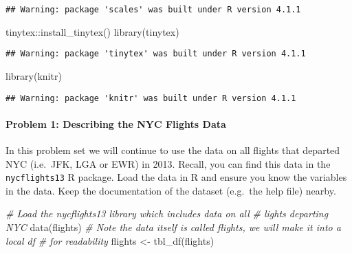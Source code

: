 \documentclass[
]{article}
\newenvironment{Shaded}{\begin{snugshade}}{\end{snugshade}}
\newcommand{\CommentTok}[1]{\textcolor[rgb]{0.56,0.35,0.01}{\textit{#1}}}
\newcommand{\FunctionTok}[1]{\textcolor[rgb]{0.00,0.00,0.00}{#1}}
\newcommand{\NormalTok}[1]{#1}
\newcommand{\OtherTok}[1]{\textcolor[rgb]{0.56,0.35,0.01}{#1}}
\newcommand{\SpecialCharTok}[1]{\textcolor[rgb]{0.00,0.00,0.00}{#1}}
\begin{document}
\begin{verbatim}
## Warning: package 'scales' was built under R version 4.1.1
\end{verbatim}

\begin{Shaded}
\begin{Highlighting}[]
\NormalTok{tinytex}\SpecialCharTok{::}\FunctionTok{install\_tinytex}\NormalTok{()}
\FunctionTok{library}\NormalTok{(tinytex)}
\end{Highlighting}
\end{Shaded}

\begin{verbatim}
## Warning: package 'tinytex' was built under R version 4.1.1
\end{verbatim}

\begin{Shaded}
\begin{Highlighting}[]
\FunctionTok{library}\NormalTok{(knitr)}
\end{Highlighting}
\end{Shaded}

\begin{verbatim}
## Warning: package 'knitr' was built under R version 4.1.1
\end{verbatim}

\hypertarget{problem-1-describing-the-nyc-flights-data}{%
\paragraph{Problem 1: Describing the NYC Flights
Data}\label{problem-1-describing-the-nyc-flights-data}}

In this problem set we will continue to use the data on all flights that
departed NYC (i.e.~JFK, LGA or EWR) in 2013. Recall, you can find this
data in the \texttt{nycflights13} R package. Load the data in R and
ensure you know the variables in the data. Keep the documentation of the
dataset (e.g.~the help file) nearby.

\begin{Shaded}
\begin{Highlighting}[]
\CommentTok{\# Load the nycflights13 library which includes data on all}
\CommentTok{\# lights departing NYC}
\FunctionTok{data}\NormalTok{(flights)}
\CommentTok{\# Note the data itself is called flights, we will make it into a local df}
\CommentTok{\# for readability}
\NormalTok{flights }\OtherTok{\textless{}{-}} \FunctionTok{tbl\_df}\NormalTok{(flights)}
\end{Highlighting}
\end{Shaded}
\end{document}
